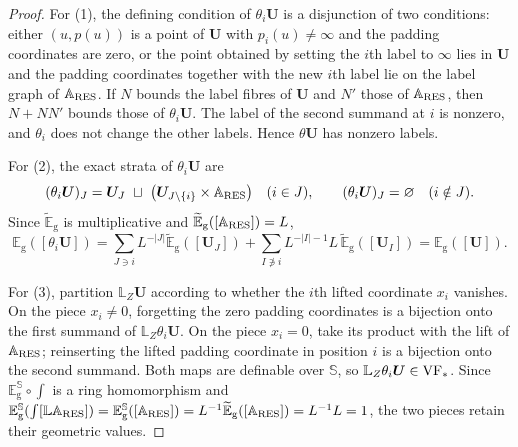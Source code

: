 \begin{proof}
For (1), the defining condition of $\theta_i\bm U$ is a disjunction of
two conditions: either $(u,p(u))$ is a point of $\bm U$ with $p_i(u)\neq\infty$
and the padding coordinates are zero, or the point obtained by setting
the $i$th label to $\infty$ lies in $\bm U$ and the padding coordinates
together with the new $i$th label lie on the label graph of
$\bm{\mathbb A}_{\mathrm{RES}}$. If $N$ bounds the label fibres of $\bm U$ and $N'$
those of $\bm{\mathbb A}_{\mathrm{RES}}$, then $N+NN'$ bounds those of
$\theta_i\bm U$. The label of the second summand at $i$ is nonzero, and
$\theta_i$ does not change the other labels. Hence $\theta\bm U$ has nonzero
labels.

For (2), the exact strata of $\theta_i\bm U$ are
\[
 (\theta_i\bm U)_J=\bm U_J\ \sqcup\ \bigl(\bm U_{J\setminus\{i\}}\times
 \bm{\mathbb A}_{\RES}\bigr)\quad(i\in J),
 \qquad (\theta_i\bm U)_J=\varnothing\quad(i\notin J).
\]
Since $\widetilde{\mathbb E}_{\mathrm g}$ is multiplicative and
$\widetilde{\mathbb E}_{\mathrm g}([\bm{\mathbb A}_{\mathrm{RES}}])=L$,
\[
 \mathbb E_{\mathrm g}([\theta_i\bm U])
 =\sum_{J\ni i}L^{-|J|}\widetilde{\mathbb E}_{\mathrm g}([\bm U_J])
  +\sum_{I\not\ni i}L^{-|I|-1}L\,\widetilde{\mathbb E}_{\mathrm g}([\bm U_I])
 =\mathbb E_{\mathrm g}([\bm U]).
\]

For (3), partition $\mathbb L_Z\bm U$ according to whether the $i$th lifted
coordinate $x_i$ vanishes. On the piece $x_i\neq0$, forgetting the zero
padding coordinates is a bijection onto the first summand of
$\mathbb L_Z\theta_i\bm U$. On the piece $x_i=0$, take its product with the
lift of $\bm{\mathbb A}_{\mathrm{RES}}$; reinserting the lifted padding coordinate
in position $i$ is a bijection onto the second summand. Both maps are
definable over $\mathbb S$, so $\mathbb L_Z\theta_i\bm U\in\mathrm{VF}_*$. Since
$\mathbb E_{\mathrm g}^{\mathbb S}\circ\int$ is a ring homomorphism and
$\mathbb E_{\mathrm g}^{\mathbb S}(\int[\mathbb L\bm{\mathbb A}_{\mathrm{RES}}])
=\mathbb E_{\mathrm g}^{\mathbb S}([\bm{\mathbb A}_{\mathrm{RES}}])
=L^{-1}\widetilde{\mathbb E}_{\mathrm g}([\bm{\mathbb A}_{\mathrm{RES}}])=L^{-1}L=1$, the two pieces
retain their geometric values.
\end{proof}

